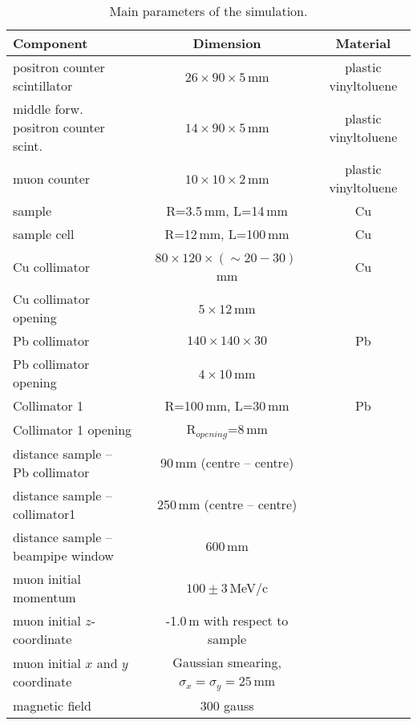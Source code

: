 \documentclass[twoside]{dis04}
\begin{document}
\begin{table}[htbp]\centering
\renewcommand{\arraystretch}{1.05}
  \begin{tabular}{|l|c|c|}
    \hline
    \lower 1mm \hbox{\textbf{Component}}  & \lower 1mm \hbox{\textbf{Dimension}} &  \lower 1mm \hbox{\textbf{Material}} \\[5pt]
    \hline
    positron counter scintillator        & $26 \times 90 \times 5$\,mm   & plastic vinyltoluene \\
    middle forw. positron counter scint. & $14 \times 90 \times 5$\,mm   & plastic vinyltoluene \\
    muon counter                         & $10 \times 10 \times 2$\,mm   & plastic vinyltoluene \\
    sample                               & R=3.5\,mm, L=14\,mm           & Cu \\
    sample cell                          & R=12\,mm, L=100\,mm           & Cu \\
    Cu collimator                & $80 \times 120 \times (\sim 20 - 30)$\,mm             & Cu  \\
    Cu collimator opening                & $5 \times 12$\,mm          &    \\
    Pb collimator                        & $140 \times 140 \times 30$ & Pb \\
    Pb collimator opening                & $4 \times 10$\,mm          &    \\
    Collimator 1                         & R=100\,mm, L=30\,mm        & Pb \\
    Collimator 1 opening                 & R$_{opening}$=8\,mm        &    \\
    distance sample -- Pb collimator     & 90\,mm (centre -- centre)  &    \\
    distance sample -- collimator1       & 250\,mm (centre -- centre) &    \\
    distance sample -- beampipe window   & 600\,mm                    &    \\ \hline
    muon initial momentum                & $100 \pm 3$\,MeV/c         &    \\
    muon initial $z$-coordinate          & -1.0\,m with respect to sample &    \\
    muon initial $x$ and $y$ coordinate  & Gaussian smearing, $\sigma_x=\sigma_y=25$\,mm & \\
    magnetic field                       & 300 gauss                  &    \\
    \hline
  \end{tabular}
  \caption{Main parameters of the simulation.}
  \label{dimensions}
\end{table}
\end{document}
